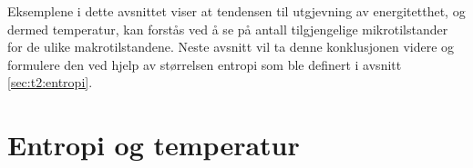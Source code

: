 Eksemplene i dette avsnittet viser at tendensen til utgjevning av energitetthet, og dermed temperatur, kan forstås ved å se på antall tilgjengelige mikrotilstander for de ulike makrotilstandene. Neste avsnitt vil ta denne konklusjonen videre og formulere den ved hjelp av størrelsen entropi som ble definert i avsnitt \ref{sec:t2:entropi}.

\section{Entropi og temperatur}